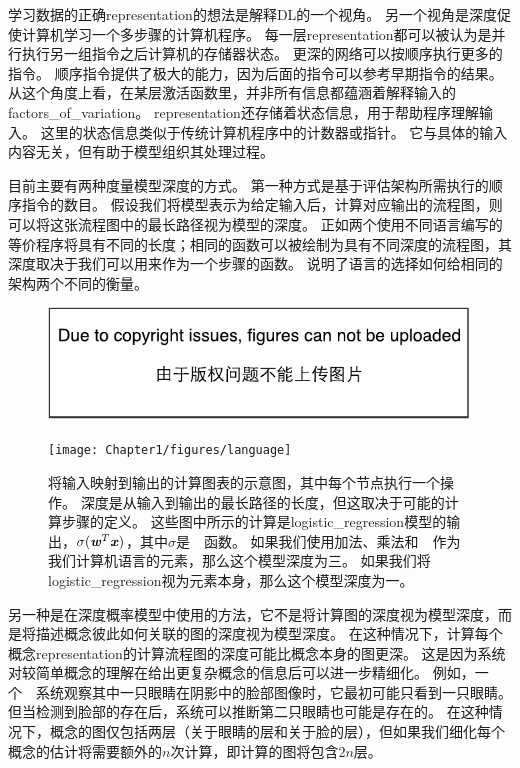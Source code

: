 学习数据的正确\gls{representation}的想法是解释\gls{DL}的一个视角。
另一个视角是深度促使计算机学习一个多步骤的计算机程序。
每一层\gls{representation}都可以被认为是并行执行另一组指令之后计算机的存储器状态。
更深的网络可以按顺序执行更多的指令。
顺序指令提供了极大的能力，因为后面的指令可以参考早期指令的结果。
从这个角度上看，在某层激活函数里，并非所有信息都蕴涵着解释输入的\gls{factors_of_variation}。
\gls{representation}还存储着状态信息，用于帮助程序理解输入。
这里的状态信息类似于传统计算机程序中的计数器或指针。
它与具体的输入内容无关，但有助于模型组织其处理过程。


目前主要有两种度量模型深度的方式。
第一种方式是基于评估架构所需执行的顺序指令的数目。
假设我们将模型表示为给定输入后，计算对应输出的流程图，则可以将这张流程图中的最长路径视为模型的深度。
正如两个使用不同语言编写的等价程序将具有不同的长度；相同的函数可以被绘制为具有不同深度的流程图，其深度取决于我们可以用来作为一个步骤的函数。
说明了语言的选择如何给相同的架构两个不同的衡量。

\begin{figure}[!htb]
\ifOpenSource
\centerline{\includegraphics{figure.pdf}}
\else
\centerline{\texttt{[image: Chapter1/figures/language]}}
\fi
\caption{将输入映射到输出的计算图表的示意图，其中每个节点执行一个操作。
深度是从输入到输出的最长路径的长度，但这取决于可能的计算步骤的定义。
这些图中所示的计算是\gls{logistic_regression}模型的输出，$\sigma(\boldsymbol{\mathit{w}}^T \boldsymbol{\mathit{x}})$，其中$\sigma$是~~函数。
如果我们使用加法、乘法和~~作为我们计算机语言的元素，那么这个模型深度为三。
如果我们将\gls{logistic_regression}视为元素本身，那么这个模型深度为一。
}
\label{fig:chap1_language}
\end{figure}

另一种是在深度概率模型中使用的方法，它不是将计算图的深度视为模型深度，而是将描述概念彼此如何关联的图的深度视为模型深度。
在这种情况下，计算每个概念\gls{representation}的计算流程图的深度可能比概念本身的图更深。
这是因为系统对较简单概念的理解在给出更复杂概念的信息后可以进一步精细化。
例如，一个~~系统观察其中一只眼睛在阴影中的脸部图像时，它最初可能只看到一只眼睛。
但当检测到脸部的存在后，系统可以推断第二只眼睛也可能是存在的。
在这种情况下，概念的图仅包括两层（关于眼睛的层和关于脸的层），但如果我们细化每个概念的估计将需要额外的$n$次计算，即计算的图将包含$2n$层。

